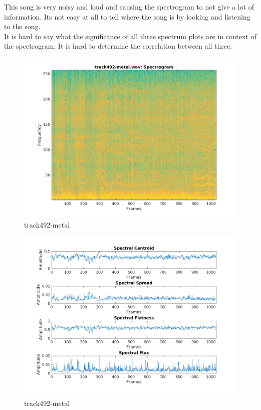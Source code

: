 \documentclass[11pt, a4paper]{article}
\begin{document}
\pagebreak
This song is very noisy and loud and causing the spectrogram to not give a lot of information. Its not easy at all to tell where the song is by looking and listening to the song. \\

It is hard to say what the significance of all three spectrum plots are in context of the spectrogram. It is hard to determine the correlation between all three. \\

\pagebreak
\begin{figure}[H]
    \centering
    \includegraphics[width=.75\textwidth]{track492-metal-specto.png}
    \caption{track492-metal}
\end{figure}
\begin{figure}[H]
    \centering
    \includegraphics[width=1\textwidth]{track492-metal-spectral.png}
    \caption{track492-metal}
\end{figure}
\pagebreak
\end{document}
